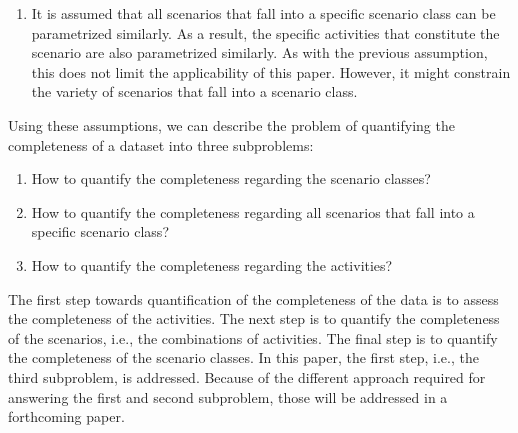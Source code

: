 \begin{enumerate}
	\item It is assumed that all scenarios that fall into a specific scenario class can be parametrized similarly. As a result, the specific activities that constitute the scenario are also parametrized similarly. As with the previous assumption, this does not limit the applicability of this paper. However, it might constrain the variety of scenarios that fall into a scenario class. 
\end{enumerate}

Using these assumptions, we can describe the problem of quantifying the completeness of a dataset into three subproblems:
\begin{enumerate}
	\item How to quantify the completeness regarding the scenario classes?
	\item How to quantify the completeness regarding all scenarios that fall into a specific scenario class?
	\item How to quantify the completeness regarding the activities?
\end{enumerate}


The first step towards quantification of the completeness of the data is to assess the completeness of the activities. The next step is to quantify the completeness of the scenarios, i.e., the combinations of activities. The final step is to quantify the completeness of the scenario classes. In this paper,  the first step, i.e., the third subproblem, is addressed. Because of the different approach required for answering the first and second subproblem, those will be addressed in a forthcoming paper. 
